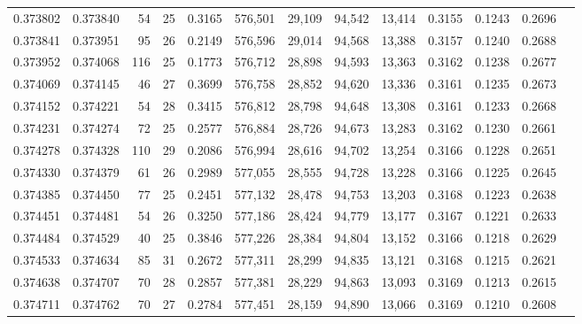 \begin{tabular}{rrrrrrrrrrrrr}
0.373802 & 0.373840 &    54 &  25 &                                     0.3165 & 576,501 &  29,109 &  94,542 &  13,414 & 0.3155 & 0.1243 & 0.2696 \\
0.373841 & 0.373951 &    95 &  26 &                                     0.2149 & 576,596 &  29,014 &  94,568 &  13,388 & 0.3157 & 0.1240 & 0.2688 \\
0.373952 & 0.374068 &   116 &  25 &                                     0.1773 & 576,712 &  28,898 &  94,593 &  13,363 & 0.3162 & 0.1238 & 0.2677 \\
0.374069 & 0.374145 &    46 &  27 &                                     0.3699 & 576,758 &  28,852 &  94,620 &  13,336 & 0.3161 & 0.1235 & 0.2673 \\
0.374152 & 0.374221 &    54 &  28 &                                     0.3415 & 576,812 &  28,798 &  94,648 &  13,308 & 0.3161 & 0.1233 & 0.2668 \\
0.374231 & 0.374274 &    72 &  25 &                                     0.2577 & 576,884 &  28,726 &  94,673 &  13,283 & 0.3162 & 0.1230 & 0.2661 \\
0.374278 & 0.374328 &   110 &  29 &                                     0.2086 & 576,994 &  28,616 &  94,702 &  13,254 & 0.3166 & 0.1228 & 0.2651 \\
0.374330 & 0.374379 &    61 &  26 &                                     0.2989 & 577,055 &  28,555 &  94,728 &  13,228 & 0.3166 & 0.1225 & 0.2645 \\
0.374385 & 0.374450 &    77 &  25 &                                     0.2451 & 577,132 &  28,478 &  94,753 &  13,203 & 0.3168 & 0.1223 & 0.2638 \\
0.374451 & 0.374481 &    54 &  26 &                                     0.3250 & 577,186 &  28,424 &  94,779 &  13,177 & 0.3167 & 0.1221 & 0.2633 \\
0.374484 & 0.374529 &    40 &  25 &                                     0.3846 & 577,226 &  28,384 &  94,804 &  13,152 & 0.3166 & 0.1218 & 0.2629 \\
0.374533 & 0.374634 &    85 &  31 &                                     0.2672 & 577,311 &  28,299 &  94,835 &  13,121 & 0.3168 & 0.1215 & 0.2621 \\
0.374638 & 0.374707 &    70 &  28 &                                     0.2857 & 577,381 &  28,229 &  94,863 &  13,093 & 0.3169 & 0.1213 & 0.2615 \\
0.374711 & 0.374762 &    70 &  27 &                                     0.2784 & 577,451 &  28,159 &  94,890 &  13,066 & 0.3169 & 0.1210 & 0.2608 \\

\end{tabular}
